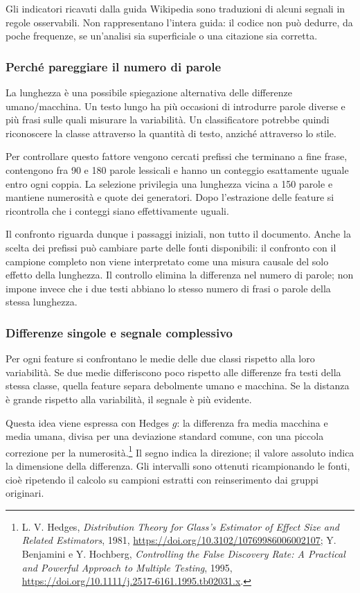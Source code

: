 Gli indicatori ricavati dalla guida Wikipedia sono traduzioni di alcuni segnali in regole osservabili. Non rappresentano l'intera guida: il codice non può dedurre, da poche frequenze, se un'analisi sia superficiale o una citazione sia corretta.

\subsubsection{Perché pareggiare il numero di parole}\label{perchuxe9-pareggiare-il-numero-di-parole}

La lunghezza è una possibile spiegazione alternativa delle differenze umano/macchina. Un testo lungo ha più occasioni di introdurre parole diverse e più frasi sulle quali misurare la variabilità. Un classificatore potrebbe quindi riconoscere la classe attraverso la quantità di testo, anziché attraverso lo stile.

Per controllare questo fattore vengono cercati prefissi che terminano a fine frase, contengono fra 90 e 180 parole lessicali e hanno un conteggio esattamente uguale entro ogni coppia. La selezione privilegia una lunghezza vicina a 150 parole e mantiene numerosità e quote dei generatori. Dopo l'estrazione delle feature si ricontrolla che i conteggi siano effettivamente uguali.

Il confronto riguarda dunque i passaggi iniziali, non tutto il documento. Anche la scelta dei prefissi può cambiare parte delle fonti disponibili: il confronto con il campione completo non viene interpretato come una misura causale del solo effetto della lunghezza. Il controllo elimina la differenza nel numero di parole; non impone invece che i due testi abbiano lo stesso numero di frasi o parole della stessa lunghezza.

\subsubsection{Differenze singole e segnale complessivo}\label{differenze-singole-e-segnale-complessivo}

Per ogni feature si confrontano le medie delle due classi rispetto alla loro variabilità. Se due medie differiscono poco rispetto alle differenze fra testi della stessa classe, quella feature separa debolmente umano e macchina. Se la distanza è grande rispetto alla variabilità, il segnale è più evidente.

Questa idea viene espressa con Hedges \(g\): la differenza fra media macchina e media umana, divisa per una deviazione standard comune, con una piccola correzione per la numerosità.\footnote{L. V. Hedges, \emph{Distribution Theory for Glass's Estimator of Effect Size and Related Estimators}, 1981, \url{https://doi.org/10.3102/10769986006002107}; Y. Benjamini e Y. Hochberg, \emph{Controlling the False Discovery Rate: A Practical and Powerful Approach to Multiple Testing}, 1995, \url{https://doi.org/10.1111/j.2517-6161.1995.tb02031.x}.} Il segno indica la direzione; il valore assoluto indica la dimensione della differenza. Gli intervalli sono ottenuti ricampionando le fonti, cioè ripetendo il calcolo su campioni estratti con reinserimento dai gruppi originari.

